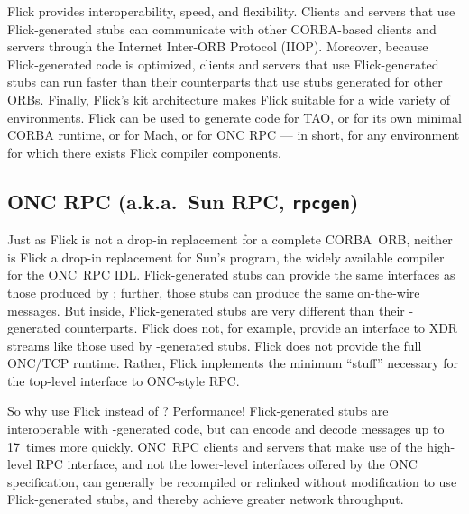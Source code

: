 Flick provides interoperability, speed, and flexibility.  Clients and servers
that use Flick-generated stubs can communicate with other CORBA-based clients
and servers through the Internet Inter-ORB Protocol (IIOP)\@.  Moreover,
because Flick-generated code is optimized, clients and servers that use
Flick-generated stubs can run faster than their counterparts that use stubs
generated for other ORBs.  Finally, Flick's kit architecture makes Flick
suitable for a wide variety of environments.  Flick can be used to generate
code for TAO, or for its own minimal CORBA runtime, or for Mach, or for ONC RPC
--- in short, for any environment for which there exists Flick compiler
components.




\subsection{ONC RPC (a.k.a.\ Sun RPC, \texttt{rpcgen})}
\label{subsec:ONC RPC}

Just as Flick is not a drop-in replacement for a complete CORBA~ORB, neither is
Flick a drop-in replacement for Sun's  program, the widely
available compiler for the ONC~RPC IDL\@.  Flick-generated stubs can provide
the same interfaces as those produced by ; further, those stubs
can produce the same on-the-wire messages.  But inside, Flick-generated stubs
are very different than their -generated counterparts.  Flick
does not, for example, provide an interface to XDR streams like those used by
-generated stubs.  Flick does not provide the full ONC/TCP
runtime.  Rather, Flick implements the minimum ``stuff'' necessary for the
top-level interface to ONC-style RPC\@.

So why use Flick instead of ?  Performance!  Flick-generated
stubs are interoperable with -generated code, but can encode
and decode messages up to 17~times more quickly.  ONC~RPC clients and servers
that make use of the high-level RPC interface, and not the lower-level
interfaces offered by the ONC specification, can generally be recompiled or
relinked without modification to use Flick-generated stubs, and thereby achieve
greater network throughput.



